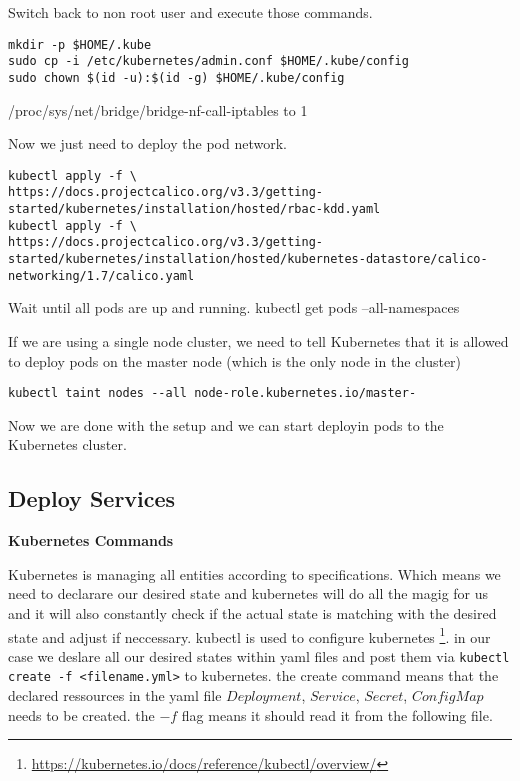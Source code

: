 Switch back to non root user and execute those commands.

\begin{verbatim}
mkdir -p $HOME/.kube
sudo cp -i /etc/kubernetes/admin.conf $HOME/.kube/config
sudo chown $(id -u):$(id -g) $HOME/.kube/config
\end{verbatim}

/proc/sys/net/bridge/bridge-nf-call-iptables to 1

Now we just need to deploy the pod network.
\begin{verbatim}
kubectl apply -f \
https://docs.projectcalico.org/v3.3/getting-started/kubernetes/installation/hosted/rbac-kdd.yaml
kubectl apply -f \
https://docs.projectcalico.org/v3.3/getting-started/kubernetes/installation/hosted/kubernetes-datastore/calico-networking/1.7/calico.yaml
\end{verbatim}

Wait until all pods are up and running.
kubectl get pods --all-namespaces

If we are using a single node cluster, we need to tell Kubernetes that it is allowed to deploy pods on the master node (which is the only node in the cluster)
\begin{verbatim}
kubectl taint nodes --all node-role.kubernetes.io/master-
\end{verbatim}

Now we are done with the setup and we can start deployin pods to the Kubernetes cluster.

\subsection{Deploy Services}

\textbf{Kubernetes Commands}

Kubernetes is managing all entities according to specifications. Which means we need to declarare our desired state and kubernetes will do all the magig for us and it will also constantly check if the actual state is matching with the desired state and adjust if neccessary.
kubectl is used to configure kubernetes \footnote{\url{https://kubernetes.io/docs/reference/kubectl/overview/}}.
in our case we deslare all our desired states within yaml files and post them via \texttt{kubectl create -f <filename.yml>} to kubernetes.
the create command means that the declared ressources in the yaml file $Deployment$, $Service$, $Secret$, $ConfigMap$ needs to be created. the $-f$ flag means it should read it from the following file.

